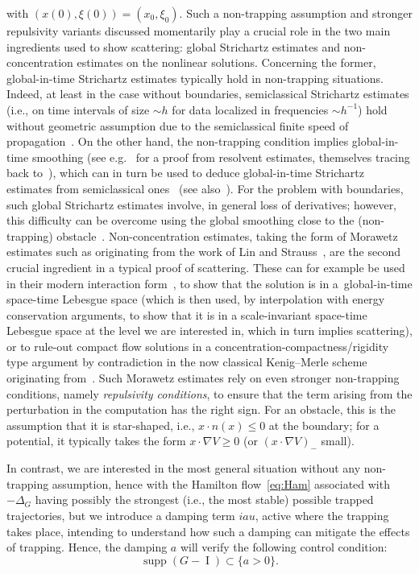 \documentclass[10pt]{amsart}
\theoremstyle{definition}\newtheorem{defi}[theo]{Definition}\newtheorem{rema}[theo]{Remark}\newtheorem{exam}[theo]{Example}\newtheorem{exem}[theo]{Example}\newtheorem{nota}[theo]{Notation}
\DeclareMathOperator{\I}{I}
\DeclareMathOperator{\supp}{supp}
\begin{document}
with $(x(0), \xi(0)) = (x_0, \xi_0)$. Such a non-trapping assumption and stronger repulsivity variants discussed momentarily play a crucial role in the two main ingredients used to show scattering: global Strichartz estimates and non-concentration estimates on the nonlinear solutions. Concerning the former, global-in-time Strichartz estimates typically hold in non-trapping situations. Indeed, at least in the case without boundaries, semiclassical Strichartz estimates (i.e., on time intervals of size $\sim h$ for data localized in frequencies $\sim h^{-1}$) hold without geometric assumption due to the semiclassical finite speed of propagation~\cite{BuGeTz04}. On the other hand, the non-trapping condition implies global-in-time smoothing (see e.g.~\cite[Section~2.3]{BuGeTz04b} for a proof from resolvent estimates, themselves tracing back to~\cite{Bu02,LaPh89, MeSj82, Va89, VaZw00}), which can in turn be used to deduce global-in-time Strichartz estimates from semiclassical ones~\cite{Iv10, StTa02} (see also~\cite{BuGuHa10,Bu03}). For the problem with boundaries, such global Strichartz estimates involve, in general loss of derivatives; however, this difficulty can be overcome using the global smoothing close to the (non-trapping) obstacle~\cite{PV1, PV2}. Non-concentration estimates, taking the form of Morawetz estimates such as originating from the work of Lin and Strauss~\cite{LinStrauss}, are the second crucial ingredient in a typical proof of scattering. These can for example be used in their modern interaction form~\cite{CoKeStTaTa04,PV1}, to show that the solution is in a~global-in-time space-time Lebesgue space (which is then used, by interpolation with energy conservation arguments, to show that it is in a scale-invariant space-time Lebesgue space at the level we are interested in, which in turn implies scattering), or to rule-out compact flow solutions in a concentration-compactness/rigidity type argument by contradiction in the now classical Kenig--Merle scheme originating from~\cite{keMe06}. Such Morawetz estimates rely on even stronger non-trapping conditions, namely \emph{repulsivity conditions}, to ensure that the term arising from the perturbation in the computation has the right sign. For an obstacle, this is the assumption that it is star-shaped, i.e., $x\cdot n(x) \leq 0$ at the boundary; for a potential, it typically takes the form $x\cdot \nabla V \geq 0$ (or $(x\cdot \nabla V)_-$ small).


In contrast, we are interested in the most general situation without any non-trapping assumption, hence with the Hamilton flow~\eqref{eq:Ham} associated with $-\Delta_G$ having possibly the strongest (i.e., the most stable) possible trapped trajectories, but we introduce a damping term $iau$, active where the trapping takes place, intending to understand how such a damping can mitigate the effects of trapping. Hence, the damping $a$ will verify the following control condition:
\begin{equation}\label{eq:control}
\supp(G- \I) \subset \{ a>0 \}.
\end{equation}
\end{document}
